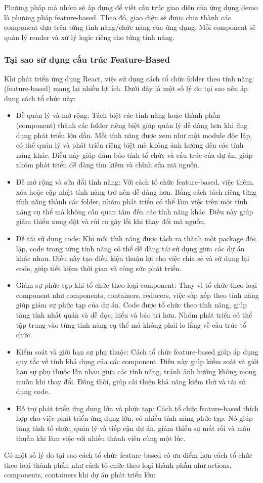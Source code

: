 Phương pháp mà nhóm sẽ áp dụng để viết cấu trúc giao diện của ứng dụng demo là phương pháp feature-based. Theo đó, giao diện sẽ được chia thành các component dựa trên từng tính năng/chức năng của ứng dụng. Mỗi component sẽ quản lý render và xử lý logic riêng cho từng tính năng.
\subsubsection{Tại sao sử dụng cấu trúc Feature-Based}
Khi phát triển ứng dụng React, việc sử dụng cách tổ chức folder theo tính năng (feature-based) mang lại nhiều lợi ích. Dưới đây là một số lý do tại sao nên áp dụng cách tổ chức này:

\begin{itemize}
    \item Dễ quản lý và mở rộng: Tách biệt các tính năng hoặc thành phần (component) thành các folder riêng biệt giúp quản lý dễ dàng hơn khi ứng dụng phát triển lớn dần. Mỗi tính năng được xem như một module độc lập, có thể quản lý và phát triển riêng biệt mà không ảnh hưởng đến các tính năng khác. Điều này giúp đảm bảo tính tổ chức và cấu trúc của dự án, giúp nhóm phát triển dễ dàng tìm kiếm và chỉnh sửa mã nguồn.
    \item Dễ mở rộng và sửa đổi tính năng: Với cách tổ chức feature-based, việc thêm, xóa hoặc cập nhật tính năng trở nên dễ dàng hơn. Bằng cách tách riêng từng tính năng thành các folder, nhóm phát triển có thể làm việc trên một tính năng cụ thể mà không cần quan tâm đến các tính năng khác. Điều này giúp giảm thiểu xung đột và rủi ro gây lỗi khi thay đổi mã nguồn.
    \item Dễ tái sử dụng code: Khi mỗi tính năng được tách ra thành một package độc lập, code trong từng tính năng có thể dễ dàng tái sử dụng giữa các dự án khác nhau. Điều này tạo điều kiện thuận lợi cho việc chia sẻ và sử dụng lại code, giúp tiết kiệm thời gian và công sức phát triển.
    \item Giảm sự phức tạp khi tổ chức theo loại component: Thay vì tổ chức theo loại component như components, containers, reducers, việc sắp xếp theo tính năng giúp giảm sự phức tạp của dự án. Code được tổ chức theo tính năng, giúp tăng tính nhất quán và dễ đọc, hiểu và bảo trì hơn. Nhóm phát triển có thể tập trung vào từng tính năng cụ thể mà không phải lo lắng về cấu trúc tổ chức.
    \item Kiểm soát và giới hạn sự phụ thuộc: Cách tổ chức feature-based giúp áp dụng quy tắc về tính khả dụng của các component. Điều này giúp kiểm soát và giới hạn sự phụ thuộc lẫn nhau giữa các tính năng, tránh ảnh hưởng không mong muốn khi thay đổi. Đồng thời, giúp cải thiện khả năng kiểm thử và tái sử dụng code.
    \item Hỗ trợ phát triển ứng dụng lớn và phức tạp: Cách tổ chức feature-based thích hợp cho việc phát triển ứng dụng lớn, có nhiều tính năng phức tạp. Nó giúp tăng tính tổ chức, quản lý và tiếp cận dự án, giảm thiểu sự mất rối và mâu thuẫn khi làm việc với nhiều thành viên cùng một lúc.
\end{itemize}
Có một số lý do tại sao cách tổ chức feature-based có ưu điểm hơn cách tổ chức theo loại thành phần như cách tổ chức theo loại thành phần như actions, components, containers khi dự án phát triển lớn:


